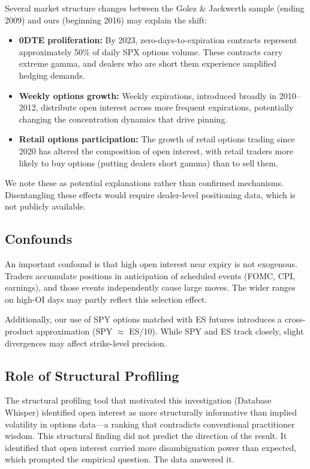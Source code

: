 \documentclass[11pt]{article}
\begin{document}
Several market structure changes between the Golez \& Jackwerth sample (ending 2009) and ours (beginning 2016) may explain the shift:

\begin{itemize}
\item \textbf{0DTE proliferation:} By 2023, zero-days-to-expiration contracts represent approximately 50\% of daily SPX options volume. These contracts carry extreme gamma, and dealers who are short them experience amplified hedging demands.
\item \textbf{Weekly options growth:} Weekly expirations, introduced broadly in 2010--2012, distribute open interest across more frequent expirations, potentially changing the concentration dynamics that drive pinning.
\item \textbf{Retail options participation:} The growth of retail options trading since 2020 has altered the composition of open interest, with retail traders more likely to buy options (putting dealers short gamma) than to sell them.
\end{itemize}

We note these as potential explanations rather than confirmed mechanisms. Disentangling these effects would require dealer-level positioning data, which is not publicly available.

\subsection{Confounds}

An important confound is that high open interest near expiry is not exogenous. Traders accumulate positions in anticipation of scheduled events (FOMC, CPI, earnings), and those events independently cause large moves. The wider ranges on high-OI days may partly reflect this selection effect.

Additionally, our use of SPY options matched with ES futures introduces a cross-product approximation (SPY $\approx$ ES/10). While SPY and ES track closely, slight divergences may affect strike-level precision.

\subsection{Role of Structural Profiling}

The structural profiling tool that motivated this investigation (Database Whisper) identified open interest as more structurally informative than implied volatility in options data---a ranking that contradicts conventional practitioner wisdom. This structural finding did not predict the direction of the result. It identified that open interest carried more disambiguation power than expected, which prompted the empirical question. The data answered it.
\end{document}
